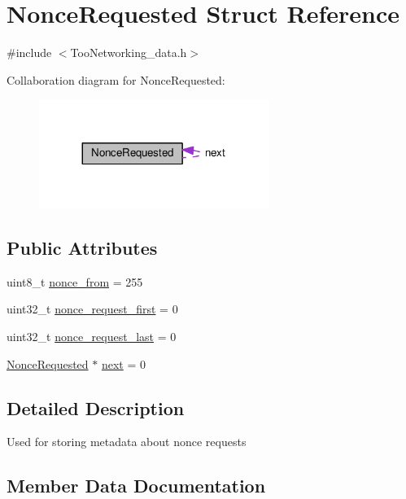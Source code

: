 \hypertarget{structNonceRequested}{}\section{Nonce\+Requested Struct Reference}
\label{structNonceRequested}


{\ttfamily \#include $<$Too\+Networking\+\_\+data.\+h$>$}



Collaboration diagram for Nonce\+Requested\+:\nopagebreak
\begin{figure}[H]
\begin{center}
\leavevmode
\includegraphics[width=212pt]{structNonceRequested__coll__graph}
\end{center}
\end{figure}
\subsection*{Public Attributes}
\begin{DoxyCompactItemize}
\item 
uint8\+\_\+t \hyperlink{structNonceRequested_a49d5f4e83fa72e51cc37237cc46f3a7e}{nonce\+\_\+from} = 255
\item 
uint32\+\_\+t \hyperlink{structNonceRequested_a9e2f47eec20e01c7cce1acf2d47bbf14}{nonce\+\_\+request\+\_\+first} = 0
\item 
uint32\+\_\+t \hyperlink{structNonceRequested_ae5453d115c1ba4044592921e0127f0c8}{nonce\+\_\+request\+\_\+last} = 0
\item 
\hyperlink{structNonceRequested}{Nonce\+Requested} $\ast$ \hyperlink{structNonceRequested_a2ef35667b6b2cb12f1c845ddc63f16ec}{next} = 0
\end{DoxyCompactItemize}


\subsection{Detailed Description}
Used for storing metadata about nonce requests 

\subsection{Member Data Documentation}
\mbox{\label{structNonceRequested_a2ef35667b6b2cb12f1c845ddc63f16ec}} 
